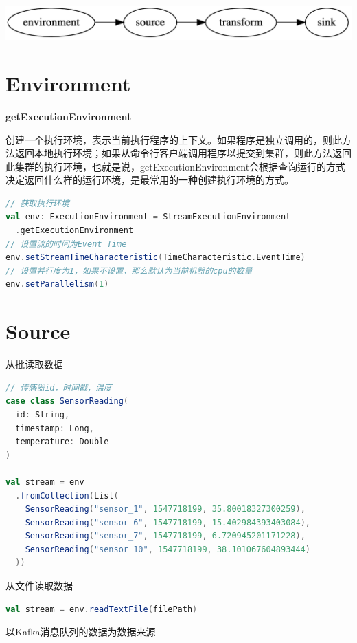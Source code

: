 \documentclass[oneside]{ctexbook}
\begin{document}
\noindent \includegraphics[width=\textwidth]{dot-example.png}

\section{Environment}

\textbf{getExecutionEnvironment}

创建一个执行环境，表示当前执行程序的上下文。如果程序是独立调用的，则此方法返回本地执行环境；如果从命令行客户端调用程序以提交到集群，则此方法返回此集群的执行环境，也就是说，getExecutionEnvironment会根据查询运行的方式决定返回什么样的运行环境，是最常用的一种创建执行环境的方式。

\begin{lstlisting}[language=scala, breaklines]
// 获取执行环境
val env: ExecutionEnvironment = StreamExecutionEnvironment
  .getExecutionEnvironment
// 设置流的时间为Event Time
env.setStreamTimeCharacteristic(TimeCharacteristic.EventTime)
// 设置并行度为1，如果不设置，那么默认为当前机器的cpu的数量
env.setParallelism(1)
\end{lstlisting}

\section{Source}

从批读取数据

\begin{lstlisting}[language=scala, breaklines]
// 传感器id，时间戳，温度
case class SensorReading(
  id: String,
  timestamp: Long,
  temperature: Double
)

val stream = env
  .fromCollection(List(
    SensorReading("sensor_1", 1547718199, 35.80018327300259),
    SensorReading("sensor_6", 1547718199, 15.402984393403084),
    SensorReading("sensor_7", 1547718199, 6.720945201171228),
    SensorReading("sensor_10", 1547718199, 38.101067604893444)
  ))
\end{lstlisting}

从文件读取数据

\begin{lstlisting}[language=scala, breaklines]
val stream = env.readTextFile(filePath)
\end{lstlisting}

以Kafka消息队列的数据为数据来源
\end{document}
